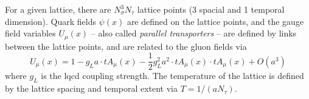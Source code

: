 For a given lattice, there are $N_{\sigma}^3 N_{\tau}$ lattice points (3 spacial and 1 temporal dimension).
Quark fields $\psi(x)$ are defined on the lattice points, and the gauge field variables $U_{\mu}(x)$ -- also called \textit{parallel transporters} -- are defined by links between the lattice points, and are related to the gluon fields via
\begin{equation}
  \label{eqn:parallel-transporter}
  U_{\mu}(x) = 1 - g_L a \cdot t A_{\mu}(x) - \frac{1}{2}g_L^2 a^2 \cdot t A_{\mu}(x) \cdot t A_{\mu}(x) + O(a^3)
\end{equation}
where $g_L$ is the \gls{lqcd} coupling strength.
The temperature of the lattice is defined by the lattice spacing and temporal extent via $T = 1/(aN_{\tau})$.



